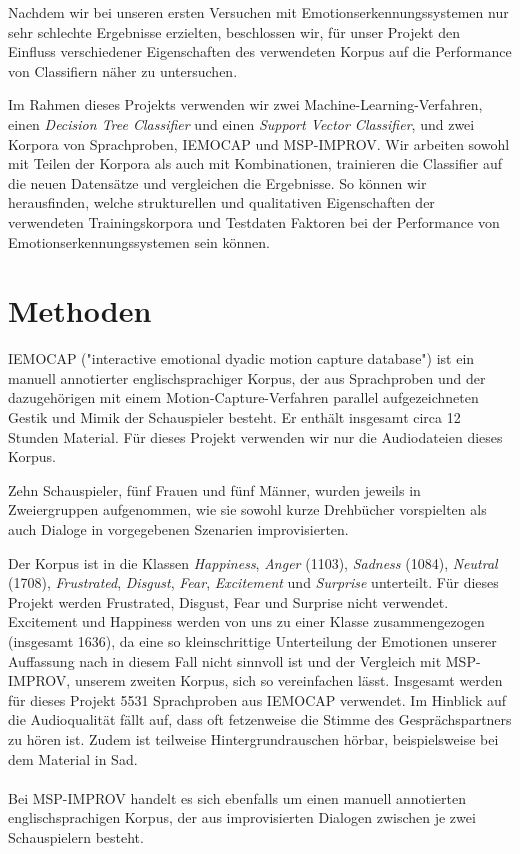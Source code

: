 \documentclass{article} %
\begin{document}
Nachdem wir bei unseren ersten Versuchen mit Emotionserkennungssystemen nur sehr schlechte Ergebnisse erzielten, beschlossen wir, für unser Projekt den Einfluss verschiedener Eigenschaften des verwendeten Korpus auf die Performance von Classifiern näher zu untersuchen. 

Im Rahmen dieses Projekts verwenden wir zwei Machine-Learning-Verfahren, einen \emph{Decision Tree Classifier} und einen \emph{Support Vector Classifier}, und zwei Korpora von Sprachproben, IEMOCAP\citep{iemocap} und MSP-IMPROV\citep{msp}. Wir arbeiten sowohl mit Teilen der Korpora als auch mit Kombinationen, trainieren die Classifier auf die neuen Datensätze und vergleichen die Ergebnisse. So können wir herausfinden, welche strukturellen und qualitativen Eigenschaften der verwendeten Trainingskorpora und Testdaten Faktoren bei der Performance von Emotionserkennungssystemen sein können. 
\section{Methoden}
IEMOCAP ("interactive emotional dyadic motion capture
database") ist ein manuell annotierter englischsprachiger Korpus, der aus Sprachproben und der dazugehörigen mit einem Motion-Capture-Verfahren parallel aufgezeichneten Gestik und Mimik der Schauspieler besteht. Er enthält insgesamt circa 12 Stunden Material. Für dieses Projekt verwenden wir nur die Audiodateien dieses Korpus. 

Zehn Schauspieler, fünf Frauen und fünf Männer, wurden jeweils in Zweiergruppen aufgenommen, wie sie sowohl kurze Drehbücher vorspielten als auch Dialoge in vorgegebenen Szenarien improvisierten. 

Der Korpus ist in die Klassen \emph{Happiness}, \emph{Anger} (1103), \emph{Sadness} (1084), \emph{Neutral} (1708), \emph{Frustrated}, \emph{Disgust}, \emph{Fear}, \emph{Excitement} und \emph{Surprise} unterteilt. Für dieses Projekt werden Frustrated, Disgust, Fear und Surprise nicht verwendet. Excitement und Happiness werden von uns zu einer Klasse zusammengezogen (insgesamt 1636), da eine so kleinschrittige Unterteilung der Emotionen unserer Auffassung nach in diesem Fall nicht sinnvoll ist und der Vergleich mit MSP-IMPROV, unserem zweiten Korpus, sich so vereinfachen lässt. Insgesamt werden für dieses Projekt 5531 Sprachproben aus IEMOCAP verwendet. 
Im Hinblick auf die Audioqualität fällt auf, dass oft fetzenweise die Stimme des Gesprächspartners zu hören ist. Zudem ist teilweise Hintergrundrauschen hörbar, beispielsweise bei dem Material in Sad. \\ \\
Bei MSP-IMPROV handelt es sich ebenfalls um einen manuell annotierten englischsprachigen Korpus, der aus improvisierten Dialogen zwischen je zwei Schauspielern besteht. 
\end{document}
